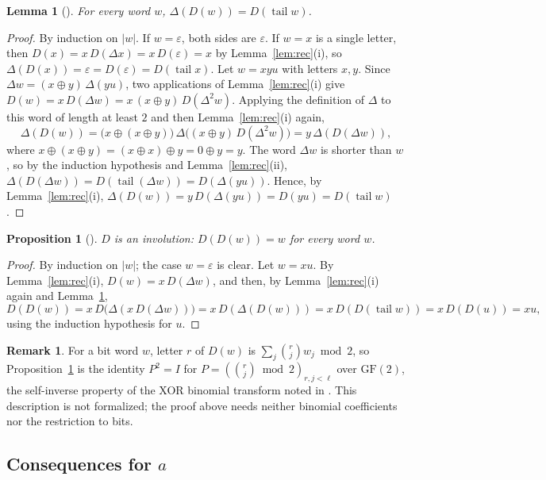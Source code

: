 \documentclass[11pt]{amsart}
\theoremstyle{plain}
\newtheorem{lemma}[theorem]{Lemma}
\newtheorem{proposition}[theorem]{Proposition}
\theoremstyle{definition}
\newtheorem{remark}[theorem]{Remark}
\newcommand{\tl}{\operatorname{tail}}
\newcommand{\len}[1]{\lvert #1\rvert}
\begin{document}
\begin{lemma}[]\label{lem:key}
For every word $w$, $\Delta(D(w))=D(\tl w)$.
\end{lemma}

\begin{proof}
By induction on $\len w$. If $w=\varepsilon$, both sides are $\varepsilon$. If $w=x$ is a single letter, then $D(x)=x\,D(\Delta x)=x\,D(\varepsilon)=x$ by Lemma~\ref{lem:rec}(i), so $\Delta(D(x))=\varepsilon=D(\varepsilon)=D(\tl x)$.
Let $w=xyu$ with letters $x,y$. Since $\Delta w=(x\oplus y)\,\Delta(yu)$, two applications of Lemma~\ref{lem:rec}(i) give $D(w)=x\,D(\Delta w)=x\,(x\oplus y)\,D(\Delta^2w)$. Applying the definition of $\Delta$ to this word of length at least $2$ and then Lemma~\ref{lem:rec}(i) again,
\[
  \Delta(D(w))=\bigl(x\oplus(x\oplus y)\bigr)\,\Delta\bigl((x\oplus y)\,D(\Delta^2w)\bigr)=y\,\Delta(D(\Delta w)),
\]
where $x\oplus(x\oplus y)=(x\oplus x)\oplus y=0\oplus y=y$. The word $\Delta w$ is shorter than $w$, so by the induction hypothesis and Lemma~\ref{lem:rec}(ii), $\Delta(D(\Delta w))=D(\tl(\Delta w))=D(\Delta(yu))$. Hence, by Lemma~\ref{lem:rec}(i),
$\Delta(D(w))=y\,D(\Delta(yu))=D(yu)=D(\tl w)$.
\end{proof}

\begin{proposition}[]\label{prop:inv}
$D$ is an involution: $D(D(w))=w$ for every word $w$.
\end{proposition}

\begin{proof}
By induction on $\len w$; the case $w=\varepsilon$ is clear. Let $w=xu$. By Lemma~\ref{lem:rec}(i), $D(w)=x\,D(\Delta w)$, and then, by Lemma~\ref{lem:rec}(i) again and Lemma~\ref{lem:key},
\[
  D(D(w))=x\,D\bigl(\Delta(x\,D(\Delta w))\bigr)=x\,D(\Delta(D(w)))=x\,D(D(\tl w))=x\,D(D(u))=xu,
\]
using the induction hypothesis for $u$.
\end{proof}

\begin{remark}
For a bit word $w$, letter $r$ of $D(w)$ is $\sum_j\binom rj w_j\bmod 2$, so Proposition~\ref{prop:inv} is the identity $P^2=I$ for $P=(\binom rj\bmod2)_{r,j<\ell}$ over $\mathrm{GF}(2)$, the self-inverse property of the XOR binomial transform noted in \cite{A099884}. This description is not formalized; the proof above needs neither binomial coefficients nor the restriction to bits.
\end{remark}

\subsection{Consequences for \texorpdfstring{$a$}{a}}
\end{document}
